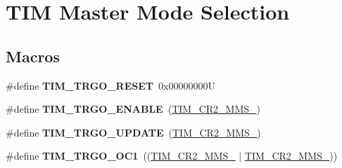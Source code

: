 \hypertarget{group___t_i_m___master___mode___selection}{}\section{T\+IM Master Mode Selection}
\label{group___t_i_m___master___mode___selection}
\subsection*{Macros}
\begin{DoxyCompactItemize}
\item 
\mbox{\label{group___t_i_m___master___mode___selection_ga32a8e436f2c0818a657b0d3fcf4e872d}} 
\#define {\bfseries T\+I\+M\+\_\+\+T\+R\+G\+O\+\_\+\+R\+E\+S\+ET}~0x00000000U
\item 
\mbox{\label{group___t_i_m___master___mode___selection_ga4ac300b0fd24d1e6532e5961680a39a9}} 
\#define {\bfseries T\+I\+M\+\_\+\+T\+R\+G\+O\+\_\+\+E\+N\+A\+B\+LE}~(\mbox{\hyperlink{group___peripheral___registers___bits___definition_gaf3e55308e84106d6501201e66bd46ab6}{T\+I\+M\+\_\+\+C\+R2\+\_\+\+M\+M\+S\+\_}})
\item 
\mbox{\label{group___t_i_m___master___mode___selection_ga27521aebd507e562fe7fba6dfc639a67}} 
\#define {\bfseries T\+I\+M\+\_\+\+T\+R\+G\+O\+\_\+\+U\+P\+D\+A\+TE}~(\mbox{\hyperlink{group___peripheral___registers___bits___definition_ga4b1036929b0a4ba5bd5cced9b8e0f4c3}{T\+I\+M\+\_\+\+C\+R2\+\_\+\+M\+M\+S\+\_}})
\item 
\mbox{\label{group___t_i_m___master___mode___selection_ga80aa9a9c41de509d99fc4cb492d6513f}} 
\#define {\bfseries T\+I\+M\+\_\+\+T\+R\+G\+O\+\_\+\+O\+C1}~((\mbox{\hyperlink{group___peripheral___registers___bits___definition_ga4b1036929b0a4ba5bd5cced9b8e0f4c3}{T\+I\+M\+\_\+\+C\+R2\+\_\+\+M\+M\+S\+\_}} $\vert$ \mbox{\hyperlink{group___peripheral___registers___bits___definition_gaf3e55308e84106d6501201e66bd46ab6}{T\+I\+M\+\_\+\+C\+R2\+\_\+\+M\+M\+S\+\_}}))
\item 
\mbox{\label{group___t_i_m___master___mode___selection_gaed715aa7ec4ad0f7f5d82dde6d964178}} 

\end{DoxyCompactItemize}
